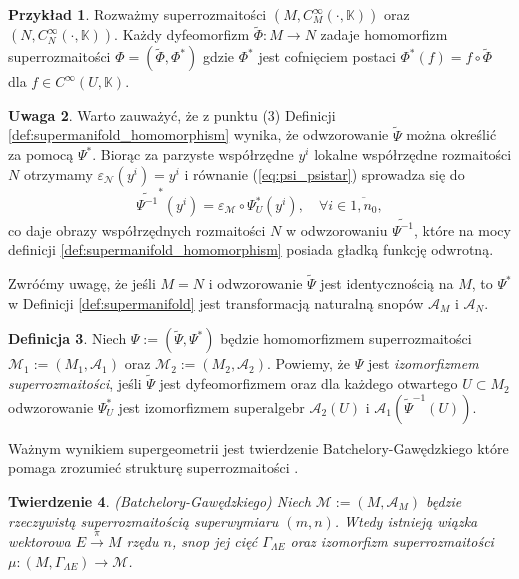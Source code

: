 \documentclass[11pt,a4paper]{report}
\newtheorem{theorem}{Twierdzenie}[section]
\theoremstyle{definition}
\newtheorem{example}[theorem]{Przykład}
\newtheorem{definition}[theorem]{Definicja}
\newtheorem{remark}[theorem]{Uwaga}
\begin{document}
\begin{example}
Rozważmy superrozmaitości $(M, C^\infty_M(\cdot, \mathbb{K}))$ oraz $(N, C^\infty_N(\cdot, \mathbb{K}))$. Każdy dyfeomorfizm $\widetilde{\Phi}: M \rightarrow N$ zadaje homomorfizm superrozmaitości $\Phi = (\widetilde{\Phi}, \Phi^*)$ gdzie $\Phi^*$ jest cofnięciem postaci $\Phi^*(f) = f \circ \widetilde{\Phi}$ dla $f \in C^\infty(U, \mathbb{K})$.
\end{example}

\begin{remark}
 Warto zauważyć, że z punktu (3) Definicji \ref{def:supermanifold_homomorphism} wynika, że odwzorowanie $\widetilde{\Psi}$ można określić za pomocą $\Psi^*$. Biorąc za parzyste współrzędne $y^i$ lokalne współrzędne rozmaitości $N$ otrzymamy $\varepsilon_\mathcal{N} (y^i) = y^i$ i równanie (\ref{eq:psi_psistar}) sprowadza się do
 \begin{equation*}
  \widetilde{\Psi^{-1}}^* (y^i) = \varepsilon_\mathcal{M} \circ \Psi_U ^* (y^i), \quad \forall i \in \overline{1, n_0},
 \end{equation*}
 co daje obrazy współrzędnych rozmaitości $N$ w odwzorowaniu $\widetilde{\Psi^{-1}}$, które na mocy definicji \ref{def:supermanifold_homomorphism} posiada gładką funkcję odwrotną.
\end{remark}

Zwróćmy uwagę, że jeśli $M = N$ i odwzorowanie $\widetilde{\Psi}$ jest identycznością na $M$, to $\Psi^*$ w Definicji \ref{def:supermanifold} jest transformacją naturalną snopów $\mathcal{A}_M$ i $\mathcal{A}_N$.

\begin{definition}
\label{def:supermanifold_isomomorphism}
Niech $\Psi := ( \widetilde{\Psi}, \Psi^* )$ będzie homomorfizmem superrozmaitości $\mathcal{M}_1 := (M_1, \mathcal{A}_1)$ oraz $\mathcal{M}_2 := (M_2, \mathcal{A}_2)$. Powiemy, że $\Psi$ jest \textit{izomorfizmem superrozmaitości}, jeśli $\widetilde{\Psi}$ jest dyfeomorfizmem oraz dla każdego otwartego $U \subset M_2$ odwzorowanie $\Psi^*_U$ jest izomorfizmem superalgebr $\mathcal{A}_2(U)$ i $\mathcal{A}_1(\widetilde{\Psi}^{-1}(U))$.
\end{definition}

Ważnym wynikiem supergeometrii jest twierdzenie Batchelory-Gawędzkiego które pomaga zrozumieć strukturę superrozmaitości \cite{batchelor}.

\begin{theorem}
\label{thm:batchelor}
 (Batchelory-Gawędzkiego) Niech $\mathcal{M} := (M, \mathcal A _M)$ będzie rzeczywistą superrozmaitością superwymiaru $(m,n)$. Wtedy istnieją wiązka wektorowa $E \stackrel{\pi}{\rightarrow} M$ rzędu $n$, snop jej cięć $\Gamma_{\Lambda E}$ oraz izomorfizm superrozmaitości $\mu: (M, \Gamma_{\Lambda E}) \rightarrow \mathcal{M}$.
\end{theorem}
\end{document}
